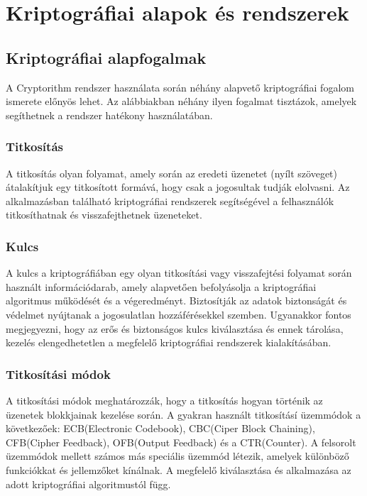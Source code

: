 \chapter{Kriptográfiai alapok és rendszerek}


\section{Kriptográfiai alapfogalmak}
A Cryptorithm rendszer használata során néhány alapvető kriptográfiai fogalom ismerete előnyös lehet. Az alábbiakban néhány ilyen fogalmat tisztázok, amelyek segíthetnek a rendszer hatékony használatában.
\subsection{Titkosítás}
A titkosítás olyan folyamat, amely során az eredeti üzenetet (nyílt szöveget) átalakítjuk egy titkosított formává, hogy csak a jogosultak tudják elolvasni. Az alkalmazásban található kriptográfiai rendszerek segítségével a felhasználók titkosíthatnak és visszafejthetnek üzeneteket.

\subsection{Kulcs}
A kulcs a kriptográfiában egy olyan titkosítási vagy visszafejtési folyamat során használt információdarab, amely alapvetően befolyásolja a kriptográfiai algoritmus működését és a végeredményt. Biztosítják az adatok biztonságát és védelmet nyújtanak a jogosulatlan hozzáférésekkel szemben. Ugyanakkor fontos megjegyezni, hogy az erős és biztonságos kulcs kiválasztása és ennek tárolása, kezelés elengedhetetlen a megfelelő kriptográfiai rendszerek kialakításában.

\newpage
\subsection{Titkosítási módok}
A titkosítási módok meghatározzák, hogy a titkosítás hogyan történik az üzenetek blokkjainak kezelése során. A gyakran használt titkosításí üzemmódok a következőek: ECB(Electronic Codebook), CBC(Ciper Block Chaining), CFB(Cipher Feedback), OFB(Output Feedback) és a CTR(Counter).
A felsorolt üzemmódok mellett számos más speciális üzemmód létezik, amelyek különböző funkciókkat és jellemzőket kínálnak. A megfelelő kiválasztása és alkalmazása az adott kriptográfiai algoritmustól függ.

